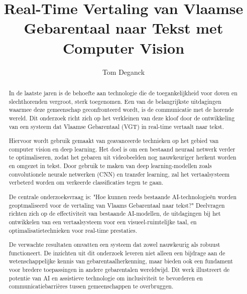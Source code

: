 \documentclass{hogent-article}
\title{Real-Time Vertaling van Vlaamse Gebarentaal naar Tekst met Computer Vision}
\author{Tom Deganck}
\begin{document}
\begin{abstract}
In de laatste jaren is de behoefte aan technologie die de toegankelijkheid voor doven en slechthorenden vergroot, sterk toegenomen. Een van de belangrijkste uitdagingen waarmee deze gemeenschap geconfronteerd wordt, is de communicatie met de horende wereld. Dit onderzoek richt zich op het verkleinen van deze kloof door de ontwikkeling van een systeem dat Vlaamse Gebarentaal (VGT) in real-time vertaalt naar tekst.

Hiervoor wordt gebruik gemaakt van geavanceerde technieken op het gebied van computer vision en deep learning. Het doel is om een bestaand neuraal netwerk verder te optimaliseren, zodat het gebaren uit videobeelden nog nauwkeuriger herkent worden en omgezet in tekst. Door gebruik te maken van deep learning-modellen zoals convolutionele neurale netwerken (CNN) en transfer learning, zal het vertaalsysteem verbeterd worden om verkeerde classificaties tegen te gaan.
  
De centrale onderzoeksvraag is: "Hoe kunnen reeds bestaande AI-technologieën worden geoptmaliseerd voor de  vertaling van Vlaams Gebarentaal naar tekst?" Deelvragen richten zich op de effectiviteit van bestaande AI-modellen, de uitdagingen bij het ontwikkelen van een vertaalsysteem voor een visueel-ruimtelijke taal, en optimalisatietechnieken voor real-time prestaties.
  
De verwachte resultaten omvatten een systeem dat zowel nauwkeurig als robuust functioneert. De inzichten uit dit onderzoek leveren niet alleen een bijdrage aan de wetenschappelijke kennis van gebarentaalherkenning, maar bieden ook een fundament voor bredere toepassingen in andere gebarentalen wereldwijd. Dit werk illustreert de potentie van AI en assistieve technologie om inclusiviteit te bevorderen en communicatiebarrières tussen gemeenschappen te overbruggen.
\end{abstract}

\tableofcontents



\printbibliography[heading=bibintoc]
\end{document}
